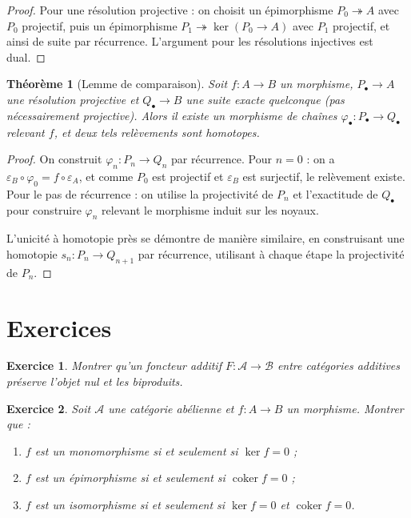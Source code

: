 \documentclass[a4paper,12pt]{book}
\DeclareMathOperator{\coker}{coker}
\newtheorem{theoreme}{Théorème}[chapter]
\newtheorem{exercice}{Exercice}[chapter]
\begin{document}
\begin{proof}
Pour une résolution projective : on choisit un épimorphisme
$P_0 \twoheadrightarrow A$ avec $P_0$ projectif, puis un épimorphisme
$P_1 \twoheadrightarrow \ker(P_0 \to A)$ avec $P_1$ projectif, et
ainsi de suite par récurrence. L'argument pour les résolutions
injectives est dual.
\end{proof}

\begin{theoreme}[Lemme de comparaison]\label{thm:comparison-lemma}
Soit $f \colon A \to B$ un morphisme, $P_\bullet \to A$ une résolution
projective et $Q_\bullet \to B$ une suite exacte quelconque (pas
nécessairement projective). Alors il existe un morphisme de chaînes
$\varphi_\bullet \colon P_\bullet \to Q_\bullet$ relevant $f$, et
deux tels relèvements sont homotopes.
\end{theoreme}

\begin{proof}
On construit $\varphi_n \colon P_n \to Q_n$ par récurrence.
Pour $n = 0$ : on a $\varepsilon_B \circ \varphi_0 = f \circ \varepsilon_A$,
et comme $P_0$ est projectif et $\varepsilon_B$ est surjectif, le
relèvement existe. Pour le pas de récurrence : on utilise la
projectivité de $P_n$ et l'exactitude de $Q_\bullet$ pour construire
$\varphi_n$ relevant le morphisme induit sur les noyaux.

L'unicité à homotopie près se démontre de manière similaire, en
construisant une homotopie $s_n \colon P_n \to Q_{n+1}$ par
récurrence, utilisant à chaque étape la projectivité de $P_n$.
\end{proof}


\section{Exercices}\label{sec:exos-abelian}

\begin{exercice}\label{exo:additive-functor-zero}
Montrer qu'un foncteur additif $F \colon \mathcal{A} \to \mathcal{B}$
entre catégories additives préserve l'objet nul et les biproduits.
\end{exercice}

\begin{exercice}\label{exo:abelian-mono-epi}
Soit $\mathcal{A}$ une catégorie abélienne et $f \colon A \to B$ un
morphisme. Montrer que :
\begin{enumerate}[label=(\alph*)]
\item $f$ est un monomorphisme si et seulement si $\ker f = 0$ ;
\item $f$ est un épimorphisme si et seulement si $\coker f = 0$ ;
\item $f$ est un isomorphisme si et seulement si $\ker f = 0$ et
  $\coker f = 0$.
\end{enumerate}
\end{exercice}
\end{document}
